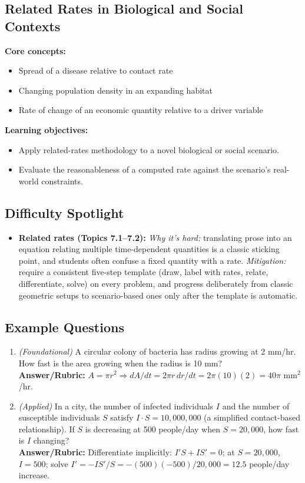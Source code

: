 \documentclass{article}
\begin{document}
\subsection{Related Rates in Biological and Social Contexts}
\textbf{Core concepts:}
\begin{itemize}[leftmargin=*]
  \item Spread of a disease relative to contact rate
  \item Changing population density in an expanding habitat
  \item Rate of change of an economic quantity relative to a driver variable
\end{itemize}
\textbf{Learning objectives:}
\begin{itemize}[leftmargin=*]
  \item Apply related-rates methodology to a novel biological or social scenario.
  \item Evaluate the reasonableness of a computed rate against the scenario's real-world constraints.
\end{itemize}

\subsection*{Difficulty Spotlight}
\begin{itemize}[leftmargin=*]
  \item \textbf{Related rates (Topics 7.1--7.2):} \textit{Why it's hard:} translating prose into an equation relating multiple time-dependent quantities is a classic sticking point, and students often confuse a fixed quantity with a rate. \textit{Mitigation:} require a consistent five-step template (draw, label with rates, relate, differentiate, solve) on every problem, and progress deliberately from classic geometric setups to scenario-based ones only after the template is automatic.
\end{itemize}

\subsection*{Example Questions}
\begin{enumerate}[leftmargin=*]
  \item \textit{(Foundational)} A circular colony of bacteria has radius growing at 2 mm/hr. How fast is the area growing when the radius is 10 mm? \\
  \textbf{Answer/Rubric:} $A=\pi r^2 \Rightarrow dA/dt = 2\pi r \, dr/dt = 2\pi(10)(2)=40\pi$ mm$^2$/hr.
  \item \textit{(Applied)} In a city, the number of infected individuals $I$ and the number of susceptible individuals $S$ satisfy $I \cdot S = 10{,}000{,}000$ (a simplified contact-based relationship). If $S$ is decreasing at 500 people/day when $S=20{,}000$, how fast is $I$ changing? \\
  \textbf{Answer/Rubric:} Differentiate implicitly: $I'S + IS' = 0$; at $S=20{,}000$, $I=500$; solve $I' = -IS'/S = -(500)(-500)/20{,}000 = 12.5$ people/day increase.
\end{enumerate}
\end{document}
